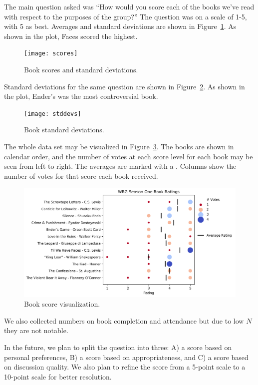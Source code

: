 \documentclass{article}
\newcommand{\PLOT}[1]{Figure~\ref{plot:#1}}
\begin{document}
The main question asked was ``How would you score each of the books we've read with respect to the purposes of the group?''  The question was on a scale of 1-5, with 5 as best.  Averages and standard deviations are shown in \PLOT{scores}.  As shown in the plot, Faces scored the highest.

\newcommand{\plotwidth}{0.9}

\begin{figure}
\texttt{[image: scores]}
\caption{Book scores and standard deviations.
  \label{plot:scores}}
\end{figure}

Standard deviations for the same question are shown in \PLOT{stddevs}.  As shown in the plot, Ender's was the most controversial book.

\begin{figure}
\texttt{[image: stddevs]}
\caption{Book standard deviations.
  \label{plot:stddevs}}
\end{figure}

The whole data set may be visualized in \PLOT{viz}.  The books are shown in calendar order, and the number of votes at each score level for each book may be seen from left to right.  The averages are marked with a \pmb{\textbar}.  Columns show the number of votes for that score each book received.

\begin{figure}
\includegraphics[width=\columnwidth]{viz}
\caption{Book score visualization.
  \label{plot:viz}}
\end{figure}

We also collected numbers on book completion and attendance but due to low $N$ they are not notable.

In the future, we plan to split the question into three: A) a score based on personal preferences, B) a score based on appropriateness, and C) a score based on discussion quality.  We also plan to refine the score from a 5-point scale to a 10-point scale for better resolution.
\end{document}
